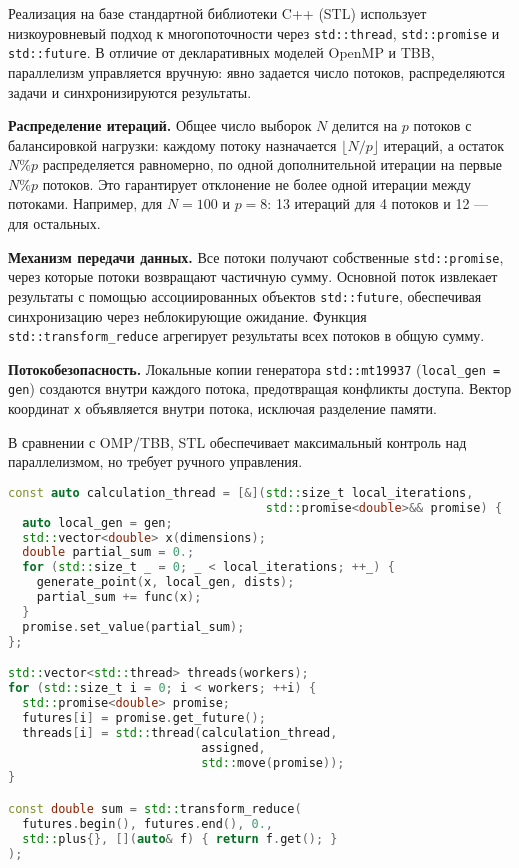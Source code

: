 \documentclass[a4paper,12pt]{article}
\begin{document}
Реализация на базе стандартной библиотеки C++ (STL) использует низкоуровневый подход к многопоточности через \texttt{std::thread}, \texttt{std::promise} и \texttt{std::future}. В отличие от декларативных моделей OpenMP и TBB, параллелизм управляется вручную: явно задается число потоков, распределяются задачи и синхронизируются результаты.

\textbf{Распределение итераций.} 
Общее число выборок \( N \) делится на \( p \) потоков с балансировкой нагрузки: каждому потоку назначается \( \lfloor N/p \rfloor \) итераций, а остаток \( N \% p \) распределяется равномерно, по одной дополнительной итерации на первые \( N \% p \) потоков. Это гарантирует отклонение не более одной итерации между потоками. Например, для \( N = 100 \) и \( p = 8 \): 13 итераций для 4 потоков и 12 — для остальных.

\textbf{Механизм передачи данных.} 
Все потоки получают собственные \texttt{std::promise}, через которые потоки возвращают частичную сумму. Основной поток извлекает результаты с помощью ассоциированных объектов \texttt{std::future}, обеспечивая синхронизацию через неблокирующие ожидание. Функция \texttt{std::transform\_reduce} агрегирует результаты всех потоков в общую сумму.

\textbf{Потокобезопасность.} 
Локальные копии генератора \texttt{std::mt19937} (\texttt{local\_gen = gen}) создаются внутри каждого потока, предотвращая конфликты доступа. Вектор координат \texttt{x} объявляется внутри потока, исключая разделение памяти.

В сравнении с OMP/TBB, STL обеспечивает максимальный контроль над параллелизмом, но требует ручного управления.

\begin{lstlisting}[language=C++, caption=Фрагмент STL-реализации]
const auto calculation_thread = [&](std::size_t local_iterations,
                                    std::promise<double>&& promise) {
  auto local_gen = gen;
  std::vector<double> x(dimensions);
  double partial_sum = 0.;
  for (std::size_t _ = 0; _ < local_iterations; ++_) {
    generate_point(x, local_gen, dists); 
    partial_sum += func(x);
  }
  promise.set_value(partial_sum);
};

std::vector<std::thread> threads(workers);
for (std::size_t i = 0; i < workers; ++i) {
  std::promise<double> promise;
  futures[i] = promise.get_future();
  threads[i] = std::thread(calculation_thread,
                           assigned,
                           std::move(promise));
}

const double sum = std::transform_reduce(
  futures.begin(), futures.end(), 0.,
  std::plus{}, [](auto& f) { return f.get(); }
);
\end{lstlisting}
\end{document}
